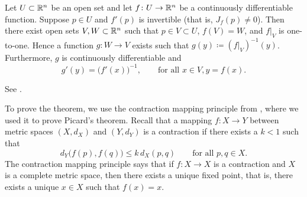 \begin{thm}
\label{thm:inverse}
Let $U \subset {\mathbb{R}}^n$ be an open set and let
$f \colon U \to {\mathbb{R}}^n$ be a continuously differentiable function.
Suppose $p \in U$ and $f'(p)$ is invertible
(that is, $J_f(p) \neq 0$).
Then there exist open sets $V, W \subset {\mathbb{R}}^n$ such that
$p \in V \subset U$, $f(V) = W$, and $f|_V$ is one-to-one.  
Hence a function $g \colon W \to V$ exists such that
$g(y) \coloneqq (f|_V)^{-1}(y)$.
Furthermore, $g$ is continuously differentiable
and 
\begin{equation*}
g'(y) = {\bigl(f'(x)\bigr)}^{-1}, \qquad \text{for all } x \in V, y = f(x).
\end{equation*}
\end{thm}
See .

\begin{myfigureht}
\caption{Setup of the inverse function theorem in $\R^n$.\label{fig:inversefuncRn}}
\end{myfigureht}

To prove the theorem, we use the contraction mapping
principle from
,
where we used it
to prove Picard's theorem.
Recall that a mapping $f \colon X \to Y$ between metric
spaces $(X,d_X)$ and $(Y,d_Y)$ is a contraction 
if there exists a $k < 1$ such that
\begin{equation*}
d_Y\bigl(f(p),f(q)\bigr) \leq k \, d_X(p,q)
\qquad \text{for all } p,q \in X.
\end{equation*}
The contraction mapping principle says that if $f \colon X \to X$
is a contraction and $X$ is a complete metric space,
then there exists a unique fixed point, that is,
there exists a unique $x \in X$ such that $f(x) = x$.

